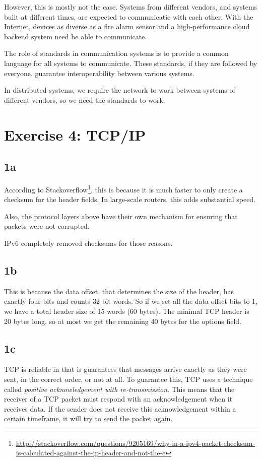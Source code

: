 \documentclass[a4paper]{article}
\begin{document}
However, this is mostly not the case. Systems from different vendors, and systems built at different times, are expected to communicatie with each other. With the Internet, devices as diverse as a fire alarm sensor and a high-performance cloud backend system need be able to communicate.

The role of standards in communication systems is to provide a common language for all systems to communicate. These standards, if they are followed by everyone, guarantee interoperability between various systems.

In distributed systems, we require the network to work between systems of different vendors, so we need the standards to work.

\section{Exercise 4: TCP/IP}

\subsection{1a}

According to Stackoverflow\footnote{\url{http://stackoverflow.com/questions/9205169/why-in-a-ipv4-packet-checksum-is-calculated-against-the-ip-header-and-not-the-e}}, this is because it is much faster to only create a checksum for the header fields. In large-scale routers, this adds substantial speed.

Also, the protocol layers above have their own mechanism for ensuring that packets were not corrupted. 

IPv6 completely removed checksums for those reasons.

\subsection{1b}

This is because the data offset, that determines the size of the header, has exactly four bits and counts 32 bit words. So if we set all the data offset bits to 1, we have a total header size of 15 words (60 bytes). The minimal TCP header is 20 bytes long, so at most we get the remaining 40 bytes for the options field.

\subsection{1c}

TCP is reliable in that is guarantees that messages arrive exactly as they were sent, in the correct order, or not at all. To guarantee this, TCP uses a technique called \textit{positive acknowledgement with re-transmission}. This means that the receiver of a TCP packet must respond with an acknowledgement when it receives data. If the sender does not receive this acknowledgement within a certain timeframe, it will try to send the packet again.
\end{document}
